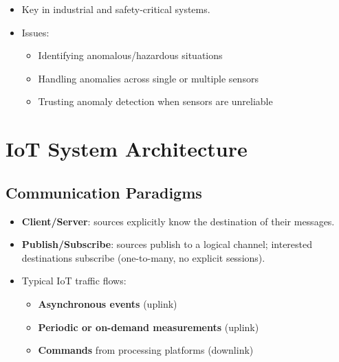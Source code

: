 \documentclass[a4paper, 12pt]{book} %
\begin{document}
\begin{itemize}
\tightlist
\item
  Key in industrial and safety-critical systems.
\item
  Issues:

  \begin{itemize}
  \tightlist
  \item
    Identifying anomalous/hazardous situations
  \item
    Handling anomalies across single or multiple sensors
  \item
    Trusting anomaly detection when sensors are unreliable
  \end{itemize}
\end{itemize}


\chapter{IoT System Architecture}\label{iot-system-architecture}

\section{Communication Paradigms}\label{communication-paradigms}

\begin{itemize}
\tightlist
\item
  \textbf{Client/Server}: sources explicitly know the destination of
  their messages.
\item
  \textbf{Publish/Subscribe}: sources publish to a logical channel;
  interested destinations subscribe (one-to-many, no explicit sessions).
\item
  Typical IoT traffic flows:

  \begin{itemize}
  \tightlist
  \item
    \textbf{Asynchronous events} (uplink)
  \item
    \textbf{Periodic or on-demand measurements} (uplink)
  \item
    \textbf{Commands} from processing platforms (downlink)
  \end{itemize}
\end{itemize}
\end{document}
